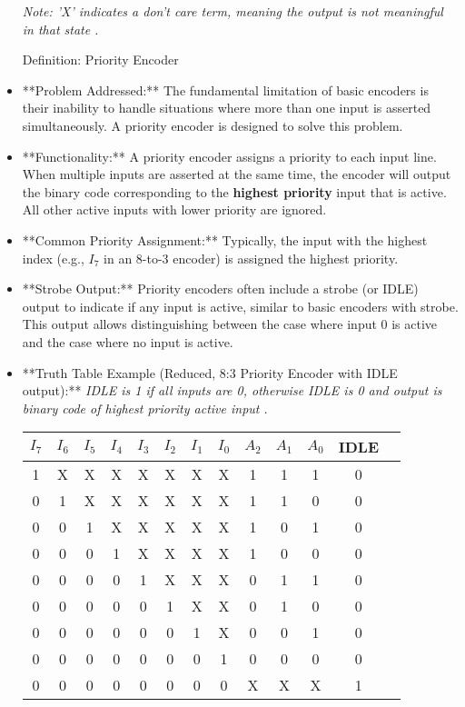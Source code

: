 \documentclass{article}
\begin{document}
\begin{itemize}
 \textit{Note: 'X' indicates a don't care term, meaning the output is not meaningful in that state} \textit{.}

Definition: Priority Encoder

\item **Problem Addressed:** The fundamental limitation of basic encoders is their inability to handle situations where more than one input is asserted simultaneously. A priority encoder is designed to solve this problem.

\item **Functionality:** A priority encoder assigns a priority to each input line. When multiple inputs are asserted at the same time, the encoder will output the binary code corresponding to the \textbf{highest priority} input that is active. All other active inputs with lower priority are ignored.

\item **Common Priority Assignment:** Typically, the input with the highest index (e.g., $I_7$ in an 8-to-3 encoder) is assigned the highest priority.

\item **Strobe Output:** Priority encoders often include a strobe (or IDLE) output to indicate if any input is active, similar to basic encoders with strobe. This output allows distinguishing between the case where input 0 is active and the case where no input is active.

\item **Truth Table Example (Reduced, 8:3 Priority Encoder with IDLE output):** \textit{IDLE is 1 if all inputs are 0, otherwise IDLE is 0 and output is binary code of highest priority active input} \textit{.} \begin{tabular}{|ccccccccc|cccc|} \\ \hline
 $I_7$ & $I_6$ & $I_5$ & $I_4$ & $I_3$ & $I_2$ & $I_1$ & $I_0$ & $A_2$ & $A_1$ & $A_0$ & IDLE \\ \hline

 1 & X & X & X & X & X & X & X & 1 & 1 & 1 & 0 \\ 0 & 1 & X & X & X & X & X & X & 1 & 1 & 0 & 0 \\ 0 & 0 & 1 & X & X & X & X & X & 1 & 0 & 1 & 0 \\ 0 & 0 & 0 & 1 & X & X & X & X & 1 & 0 & 0 & 0 \\ 0 & 0 & 0 & 0 & 1 & X & X & X & 0 & 1 & 1 & 0 \\ 0 & 0 & 0 & 0 & 0 & 1 & X & X & 0 & 1 & 0 & 0 \\ 0 & 0 & 0 & 0 & 0 & 0 & 1 & X & 0 & 0 & 1 & 0 \\ 0 & 0 & 0 & 0 & 0 & 0 & 0 & 1 & 0 & 0 & 0 & 0 \\ 0 & 0 & 0 & 0 & 0 & 0 & 0 & 0 & X & X & X & 1 \\ \hline


\end{tabular}
\end{itemize}
\end{document}
